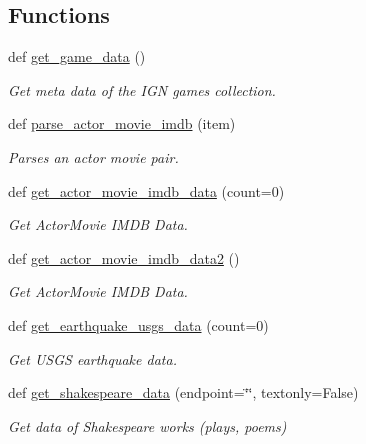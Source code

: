 \subsection*{Functions}
\begin{DoxyCompactItemize}
\item 
def \hyperlink{namespacebridges_1_1data__src__dependent_1_1data__source_a31b64b8c7a42cdfca0a5f0ae3da187d2}{get\+\_\+game\+\_\+data} ()
\begin{DoxyCompactList}\small\item\em Get meta data of the I\+GN games collection. \end{DoxyCompactList}\item 
def \hyperlink{namespacebridges_1_1data__src__dependent_1_1data__source_adcd1eb0d5e4c80095232e808f34469ad}{parse\+\_\+actor\+\_\+movie\+\_\+imdb} (item)
\begin{DoxyCompactList}\small\item\em Parses an actor movie pair. \end{DoxyCompactList}\item 
def \hyperlink{namespacebridges_1_1data__src__dependent_1_1data__source_af749e618490362a6050faa57c874e487}{get\+\_\+actor\+\_\+movie\+\_\+imdb\+\_\+data} (count=0)
\begin{DoxyCompactList}\small\item\em Get Actor\+Movie I\+M\+DB Data. \end{DoxyCompactList}\item 
def \hyperlink{namespacebridges_1_1data__src__dependent_1_1data__source_a279aa1a757f4838f3d048651cb1a7d26}{get\+\_\+actor\+\_\+movie\+\_\+imdb\+\_\+data2} ()
\begin{DoxyCompactList}\small\item\em Get Actor\+Movie I\+M\+DB Data. \end{DoxyCompactList}\item 
def \hyperlink{namespacebridges_1_1data__src__dependent_1_1data__source_a56e51efb893b496b89099016b94e0c0a}{get\+\_\+earthquake\+\_\+usgs\+\_\+data} (count=0)
\begin{DoxyCompactList}\small\item\em Get U\+S\+GS earthquake data. \end{DoxyCompactList}\item 
def \hyperlink{namespacebridges_1_1data__src__dependent_1_1data__source_a141593343ceef42e35072b3151a8b2db}{get\+\_\+shakespeare\+\_\+data} (endpoint=\char`\"{}\char`\"{}, textonly=False)
\begin{DoxyCompactList}\small\item\em Get data of Shakespeare works (plays, poems) \end{DoxyCompactList}\item 

\end{DoxyCompactItemize}
